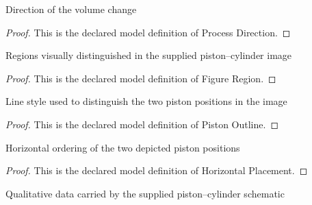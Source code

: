 \begin{definition}
  \label{def:physics:phyx-mini-0460:phyxminiproblems-problemphyxmini0460-processdirection}
  Direction of the volume change
\end{definition}
\begin{proof}
  This is the declared model definition of Process Direction.
\end{proof}
\begin{definition}
  \label{def:physics:phyx-mini-0460:phyxminiproblems-problemphyxmini0460-figureregion}
  Regions visually distinguished in the supplied piston--cylinder image
\end{definition}
\begin{proof}
  This is the declared model definition of Figure Region.
\end{proof}
\begin{definition}
  \label{def:physics:phyx-mini-0460:phyxminiproblems-problemphyxmini0460-pistonoutline}
  Line style used to distinguish the two piston positions in the image
\end{definition}
\begin{proof}
  This is the declared model definition of Piston Outline.
\end{proof}
\begin{definition}
  \label{def:physics:phyx-mini-0460:phyxminiproblems-problemphyxmini0460-horizontalplacement}
  Horizontal ordering of the two depicted piston positions
\end{definition}
\begin{proof}
  This is the declared model definition of Horizontal Placement.
\end{proof}
\begin{definition}
  \label{def:physics:phyx-mini-0460:phyxminiproblems-problemphyxmini0460-pistoncylinderfigure}
  Qualitative data carried by the supplied piston--cylinder schematic
\end{definition}
